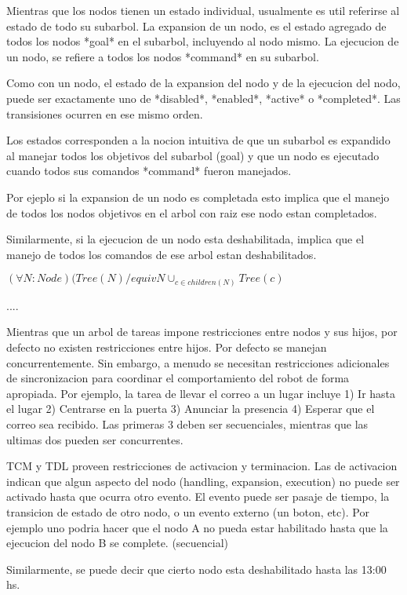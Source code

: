 Mientras que los nodos tienen un estado individual, usualmente es util referirse al estado de todo su subarbol.
La expansion de un nodo, es el estado agregado de todos los nodos *goal* en el subarbol, incluyendo al nodo mismo.
La ejecucion de un nodo, se refiere a todos los nodos *command* en su subarbol.

Como con un nodo, el estado de la expansion del nodo y de la ejecucion del nodo, puede ser 
exactamente uno de *disabled*, *enabled*, *active* o *completed*. Las transisiones ocurren en ese mismo orden.

Los estados corresponden a la nocion intuitiva de que un subarbol es expandido al manejar todos los objetivos del subarbol (goal) y que
un nodo es ejecutado cuando todos sus comandos *command* fueron manejados.

Por ejeplo si la expansion de un nodo es completada esto implica que el manejo de todos los nodos objetivos en el arbol con raiz
ese nodo estan completados.

Similarmente, si la ejecucion de un nodo esta deshabilitada, implica que el manejo de todos los comandos de ese 
arbol estan deshabilitados.

$(\forall N: Node)(Tree(N) /equiv {N} \cup_{c \in children(N)} Tree (c)$

....

Mientras que un arbol de tareas impone restricciones entre nodos y sus hijos, por defecto no existen restricciones entre 
hijos. Por defecto se manejan concurrentemente.
Sin embargo, a menudo se necesitan restricciones adicionales de sincronizacion para coordinar el comportamiento del robot de 
forma apropiada.
Por ejemplo, la tarea de llevar  el correo a un lugar incluye 
 1) Ir hasta el lugar
 2) Centrarse en la puerta
 3) Anunciar la presencia
 4) Esperar que el correo sea recibido.
Las primeras 3 deben ser secuenciales, mientras que las ultimas dos pueden ser concurrentes.

TCM y TDL proveen restricciones de activacion y terminacion.
Las de activacion indican que algun aspecto del nodo (handling, expansion, execution) no puede
ser activado hasta que ocurra otro evento. El evento puede ser pasaje de tiempo, la transicion de estado de otro nodo,
o un evento externo (un boton, etc).
Por ejemplo uno podria hacer que el nodo A no pueda estar habilitado hasta que la ejecucion del nodo B se complete. (secuencial)

Similarmente, se puede decir que cierto nodo esta deshabilitado hasta las 13:00 hs.

